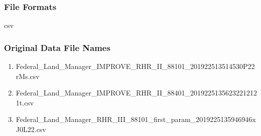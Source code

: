 \subsubsection*{File Formats} 
csv










\subsubsection*{Original Data File Names}

\begin{enumerate}[noitemsep]
\item Federal\_Land\_Manager\_IMPROVE\_RHR\_II\_88101\_201922513514530P22rMs.csv %
\item Federal\_Land\_Manager\_IMPROVE\_RHR\_II\_88401\_20192251356232212121t.csv  %
\item  Federal\_Land\_Manager\_RHR\_III\_88101\_first\_param\_2019225135946946xJ0L22.csv  %


\end{enumerate}

